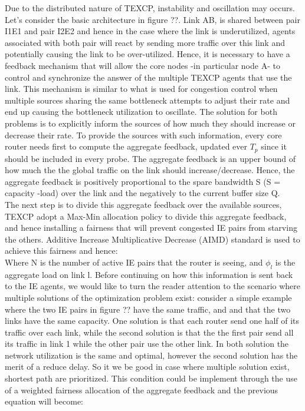 Due to the distributed nature of TEXCP, instability and oscillation may occurs. Let's consider the basic architecture in figure ??. Link AB, is shared between pair I1E1 and pair I2E2 and hence in the case where the link is underutilized, agents associated with both pair will react by sending more traffic over this link and potentially causing the link to be over-utilized. Hence, it is necessary to have a feedback mechanism that will allow the core nodes -in particular node A-  to control and synchronize the answer of the multiple TEXCP agents that use the link. This mechanism is similar to what is used for congestion control when multiple sources sharing the same bottleneck attempts to adjust their rate and end up causing the bottleneck utilization to oscillate. The solution for both problems is to explicitly inform the sources of how much they should increase or decrease their rate. To provide the sources with such information, every core router needs first to compute the aggregate feedback, updated ever $T_p$ since it should be included in every probe. The aggregate feedback is an upper bound of how much the the global traffic on the link should increase/decrease. Hence, the aggregate feedback is positively proportional to the spare bandwidth S (S = capacity -load) over the link and the negatively to the current buffer size Q.
\begin {equation}
\end {equation}
The next step is to divide this aggregate feedback over the available sources, TEXCP adopt a Max-Min allocation policy to divide this aggregate feedback, and hence installing a fairness that will prevent congested IE pairs from starving the others. Additive Increase Multiplicative Decrease (AIMD) standard is used to achieve this fairness and hence: 
\begin {equation}
\end {equation}
Where N is the number of active IE pairs that the router is seeing, and $\phi_l$ is the aggregate load on link l.
Before continuing on how this information is sent back to the IE agents, we would like to turn the reader attention to the scenario where multiple solutions of the optimization problem exist: consider a simple example where the two IE pairs in figure ?? have the same traffic, and and that the two links have the same capacity. One solution is that each router send one half of its traffic over each link, while the second solution is that the the first pair send all its traffic in link 1 while the other pair use the other link. In both solution the network utilization is the same and optimal, however the second solution has the merit of a reduce delay. So it we be good in case where multiple solution exist, shortest path are prioritized. This condition could be implement through the use of a weighted fairness allocation of the aggregate feedback and the previous equation will become: 
